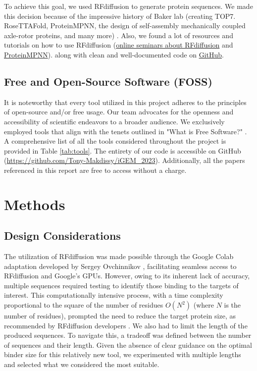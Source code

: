 \documentclass[11pt,a4paper]{article}
\begin{document}
To achieve this goal, we used RFdiffusion to generate protein 
sequences. We made this decision because of the impressive history of
Baker lab (creating TOP7. RoseTTAFold, ProteinMPNN, the design
of self-assembly mechanically coupled axle-rotor proteins, and many more) \cite{bakerlab}.
Also, we found a lot of resources and tutorials on how to use RFdiffusion 
(\href{https://www.youtube.com/watch?v=wIHwHDt2NoI}{online seminars about RFdiffusion} and 
\href{https://youtu.be/aVQQuoToTJA?si=PnQvJluY3ZPHo4TO}{ProteinMPNN}).
along with clean and well-documented code on \href{https://github.com/RosettaCommons/RFdiffusion}{GitHub}.

\subsection{Free and Open-Source Software (FOSS)}

It is noteworthy that every tool utilized in this project adheres to the principles of open-source and/or free usage. Our team advocates for the openness and accessibility of scientific endeavors to a broader audience. We exclusively employed tools that align with the tenets outlined in "What is Free Software?" \cite{gun_foss}. A comprehensive list of all the tools considered throughout the project is provided in Table \ref{tab:tools}.
The entirety of our code is accessible on GitHub (\url{https://github.com/Tony-Makdissy/iGEM_2023}).
Additionally, all the papers referenced in this report are free to access without a charge.

\section{Methods}

\subsection{Design Considerations}

The utilization of RFdiffusion was made possible through the Google Colab adaptation developed by Sergey Ovchinnikov \cite{ovchinnikov2023colab}, facilitating seamless access to RFdiffusion and Google's GPUs. However, owing to its inherent lack of accuracy, multiple sequences required testing to identify those binding to the targets of interest. This computationally intensive process, with a time complexity proportional to the square of the number of residues $O(N^2)$ (where $N$ is the number of residues), prompted the need to reduce the target protein size, as recommended by RFdiffusion developers \cite{rfdiffusion_github}. We also had to limit the length of the produced sequences. To navigate this, a tradeoff was defined between the number of sequences and their length. Given the absence of clear guidance on the optimal binder size for this relatively new tool, we experimented with multiple lengths and selected what we considered the most suitable.
\end{document}
